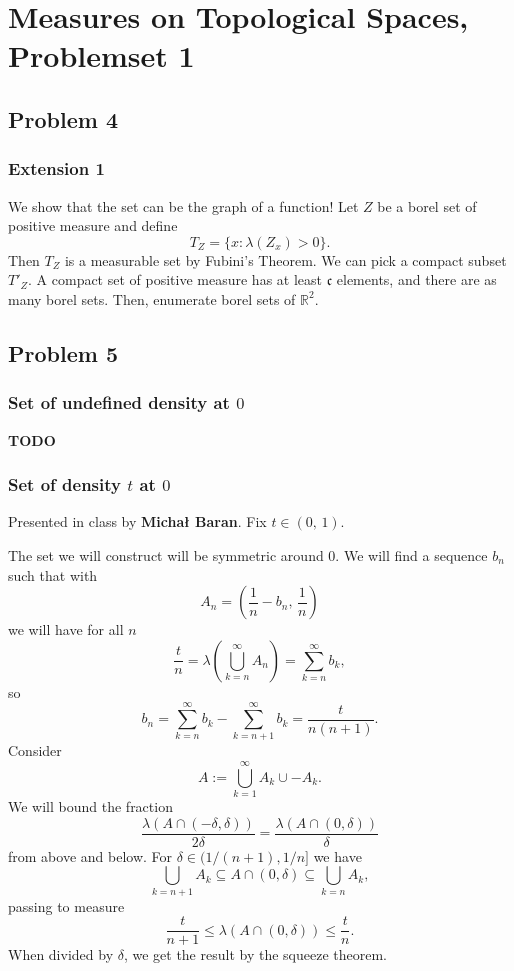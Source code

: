 \chapter{Measures on Topological Spaces, Problemset 1}

\section*{Problem 4}


\subsection*{Extension 1}
We show that the set can be the graph of a function! Let \(Z\) be a borel set of positive measure and define
\[
    T_Z = \{ x : \lambda(Z_x) > 0 \}.
\]
Then \(T_Z\) is a measurable set by Fubini's Theorem. We can pick a compact subset \( T'_Z \). A compact set of positive measure has at least \(\mathfrak{c}\) elements, and there are as many borel sets. Then, enumerate borel sets of \( \mathbb{R}^2 \).

\section*{Problem 5}

\subsection*{Set of undefined density at \( 0 \)}
\textbf{TODO} 

\subsection*{Set of density \( t \) at \( 0 \)}

Presented in class by \textbf{Michał Baran}. 
Fix \( t \in (0,\,1) \). 

The set we will construct will be symmetric around 0. We will find a sequence \( b_n \) such that with
\[ 
    A_n = \left( \frac{1}{n} - b_n,\, \frac{1}{n} \right) 
\]
we will have for all \( n \)
\[ 
    \frac{t}{n} =\lambda \left( \bigcup_{k = n}^\infty A_n \right) = \sum_{k = n}^{\infty} b_k,
\]
so
\[ 
    b_n = \sum_{k=n}^\infty b_k  - \sum_{k=n+1}^\infty b_k = \frac{t}{n(n+1)}.
\]
Consider
\[ 
    A :=  \bigcup_{k=1}^\infty A_k \cup -A_k.
\]
We will bound the fraction
\[ 
    \frac{\lambda \left( A \cap (-\delta, \delta) \right) }{2\delta} = \frac{\lambda \left( A \cap (0, \delta)  \right) }{\delta}
\]
from above and below. For \( \delta \in (1/(n+1), 1/n] \) we have
\[ 
    \bigcup_{k=n+1} A_k \subseteq A \cap (0, \delta) \subseteq \bigcup_{k=n} A_k,
\]
passing to measure
\[ 
    \frac{t}{n+1} \leqslant\lambda \left( A \cap (0, \delta) \right) \leqslant \frac{t}{n}.
\]
When divided by \( \delta \), we get the result by the squeeze theorem.

